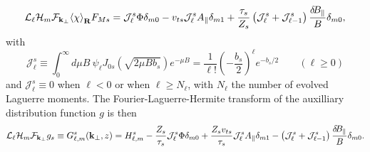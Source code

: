 \documentclass{jpp}
\begin{document}
\begin{equation}
  \mathcal{L}_\ell\mathcal{H}_m \mathcal{F}_{\bf k_\perp} \langle{ \chi \rangle}_{\bf R}F_{Ms} = \mathcal{J}_\ell^s \Phi \delta_{m 0} - v_{ts}\mathcal{J}_\ell^s A_\parallel \delta_{m1} + \frac{\tau_s}{Z_s}\left(\mathcal{J}_\ell^s + \mathcal{J}_{\ell-1}^s\right){\color{black} \frac{\delta\!B_\parallel}{B}} \delta_{m0},
\end{equation}
with 
\begin{equation}
    \mathcal{J}_\ell^s \equiv
\int_0^\infty d\mu B\ \psi_\ell J_{0s}(\sqrt{2\mu B b_s})e^{-\mu B} =  \frac{1}{\ell!} \left(-\frac{b_s}{2}\right)^\ell e^{-b_s/2} \qquad (\ell\geq0)
\end{equation}
{\color{black} and $\mathcal{J}_\ell^s\equiv0$ when $\ell<0$ or when $\ell \geq N_\ell$, with $N_\ell$ the number of evolved Laguerre moments.}
The Fourier-Laguerre-Hermite transform of the auxilliary distribution function $g$ is then
\begin{equation}
    \mathcal{L}_\ell \mathcal{H}_m \mathcal{F}_{\bf k_\perp}g_s  \equiv G_{\ell,m}^s({\bf k_\perp},z) =  H_{\ell,m}^s - \frac{Z_s}{\tau_s} \mathcal{J}_\ell^s \Phi \delta_{m 0} + \frac{Z_s v_{ts}}{\tau_s}\mathcal{J}_\ell^s A_\parallel \delta_{m1} - \left(\mathcal{J}_\ell^s + \mathcal{J}_{\ell-1}^s\right){\color{black} \frac{\delta\!B_\parallel}{B}} \delta_{m0}.
\end{equation}
\end{document}
